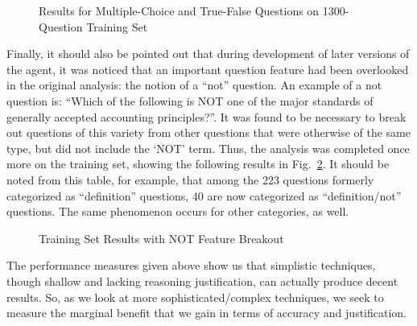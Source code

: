 \begin{figure}
\centering
{}
\caption{Results for Multiple-Choice and True-False Questions on 1300-Question Training Set}
\label{fig:version_1_training_set_results}
\end{figure}

Finally, it should also be pointed out that during development of later versions of the agent, it was noticed that an important question feature had been overlooked in the original analysis:  the notion of a ``not'' question.  An example of a not question is:  ``Which of the following is NOT one of the major standards of generally accepted accounting principles?''.  It was found to be necessary to break out questions of this variety from other questions that were otherwise of the same type, but did not include the `NOT' term.  Thus, the analysis was completed once more on the training set, showing the following results in Fig.~\ref{fig:version_1_training_set_results_not}.  It should be noted from this table, for example, that among the 223 questions formerly  categorized as ``definition'' questions, 40 are now categorized as ``definition/not'' questions.  The same phenomenon occurs for other categories, as well.  

\begin{figure}
\centering
{}
\caption{Training Set Results with NOT Feature Breakout}
\label{fig:version_1_training_set_results_not}
\end{figure}

The performance measures given above show us that simplistic techniques, though shallow and lacking reasoning justification, can actually produce decent results.  So, as we look at more sophisticated/complex techniques, we seek to measure the marginal benefit that we gain in terms of accuracy and justification.



